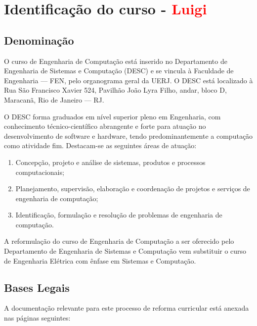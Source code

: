 \chapter{Identificação do curso - \textcolor{red}{Luigi}}

\section{Denominação}

O curso de Engenharia de Computação está inserido no Departamento de Engenharia de Sistemas e Computação (DESC) e se vincula à Faculdade de Engenharia –-- FEN, pelo organograma geral da UERJ. O DESC está localizado à Rua São Francisco Xavier 524, Pavilhão João Lyra Filho,  andar, bloco D, Maracanã, Rio de Janeiro –-- RJ.

O DESC forma graduados em nível superior pleno em Engenharia, com conhecimento técnico-científico abrangente e forte para atuação no desenvolvimento de software e hardware, tendo predominantemente a computação como atividade fim. Destacam-se as seguintes áreas de atuação:

\begin{enumerate}
    \item Concepção, projeto e análise de sistemas, produtos e processos computacionais;
    \item Planejamento, supervisão, elaboração e coordenação de projetos e serviços de engenharia de computação;
    \item Identificação, formulação e resolução de problemas de engenharia de computação.
\end{enumerate}

A reformulação do curso de Engenharia de Computação a ser oferecido pelo Departamento de Engenharia de Sistemas e Computação vem substituir o curso de Engenharia Elétrica com ênfase em Sistemas e Computação.

\section{Bases Legais}

A documentação relevante para este processo de reforma curricular está anexada nas páginas seguintes:

